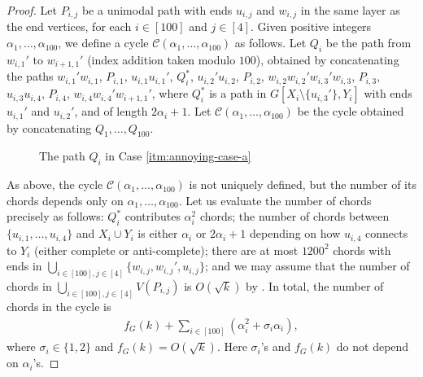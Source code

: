 \documentclass[10pt,a4paper]{amsart}
\theoremstyle{plain}
\theoremstyle{definition}
\newcommand{\C}{\mathcal{C}}
\begin{document}
\begin{proof}
        Let $P_{i, j}$ be a unimodal path with ends $u_{i, j}$ and $w_{i, j}$ in the same layer as the end vertices,
        for each $i \in [100]$ and $j \in [4]$. 
        Given positive integers $\alpha_1, \ldots, \alpha_{100}$, we define a cycle $\C(\alpha_1, \ldots, \alpha_{100})$ as follows. Let $Q_i$ be the path from $w_{i, 1}'$ to $w_{i+1, 1}'$ (index addition taken modulo $100$), obtained by concatenating the paths $w_{i, 1}' w_{i, 1}$, $P_{i, 1}$, $u_{i, 1} u_{i, 1}'$, $Q_i^*$, $u_{i, 2}'u_{i, 2}$, $P_{i, 2}$, $w_{i, 2} w_{i, 2}' w_{i, 3}' w_{i, 3}$, $P_{i,3}$, $u_{i, 3} u_{i, 4}$, $P_{i, 4}$, $w_{i, 4} w_{i, 4}' w_{i+1, 1}'$, where $Q_{i}^*$ is a path in $G[X_i \setminus \{u_{i, 3}'\}, Y_i]$ with ends $u_{i, 1}'$ and $u_{i, 2}'$, and of length $2\alpha_i + 1$. Let $\C(\alpha_1, \ldots, \alpha_{100})$ be the cycle obtained by concatenating $Q_1, \ldots, Q_{100}$.
        
        \begin{figure}
            \centering

            \caption{The path $Q_i$ in Case \ref{itm:annoying-case-a}}
            \label{fig:annoying-case-a}
        \end{figure}
        
        As above, the cycle $\C(\alpha_1, \ldots, \alpha_{100})$ is not uniquely defined, but the number of its chords depends only on $\alpha_1, \ldots, \alpha_{100}$. 
        Let us evaluate the number of chords precisely as follows: 
        $Q_{i}^*$ contributes $\alpha_i^2$ chords; 
        the number of chords between $\{u_{i, 1}, \ldots, u_{i, 4}\}$ and $X_i \cup Y_i$ is either $\alpha_i$ or $2\alpha_i+1$ depending on how $u_{i,4}$ connects to $Y_i$ (either complete or anti-complete); there are at most $1200^2$ chords with ends in $\bigcup_{i \in [100], j \in [4]}\{w_{i, j}, w_{i, j}', u_{i, j}\}$; and we may assume that the number of chords in $\bigcup_{i \in [100], j \in [4]} V(P_{i, j})$ is $O(\sqrt{k})$ by . In total, the number of chords in the cycle is
        \begin{align*}
            f_G(k) + \sum_{i \in [100]}(\alpha_i^2 + \sigma_i \alpha_i),
        \end{align*}
        where $\sigma_i \in \{1, 2\}$ and $f_G(k) = O(\sqrt{k})$. Here $\sigma_i$'s and $f_G(k)$ do not depend on $\alpha_i$'s.
        

\end{proof}
\end{document}

